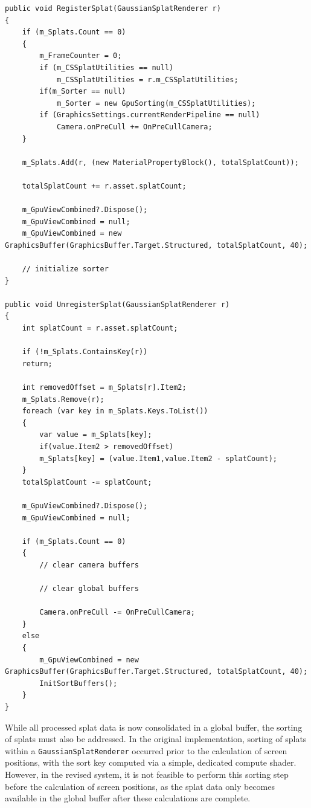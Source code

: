 \documentclass[12pt]{article}
\begin{document}
\begin{lstlisting}[tabsize=2,caption=New RegisterSplat and UnregisterSplat, label=code:register,breaklines=true,breakatwhitespace=true,basicstyle=\ttfamily\footnotesize]
public void RegisterSplat(GaussianSplatRenderer r)
{
	if (m_Splats.Count == 0)
	{
		m_FrameCounter = 0;
		if (m_CSSplatUtilities == null)
			m_CSSplatUtilities = r.m_CSSplatUtilities;
		if(m_Sorter == null)
			m_Sorter = new GpuSorting(m_CSSplatUtilities);
		if (GraphicsSettings.currentRenderPipeline == null)
			Camera.onPreCull += OnPreCullCamera;
	}
	
	m_Splats.Add(r, (new MaterialPropertyBlock(), totalSplatCount));
	
	totalSplatCount += r.asset.splatCount;
	
	m_GpuViewCombined?.Dispose();
	m_GpuViewCombined = null;
	m_GpuViewCombined = new GraphicsBuffer(GraphicsBuffer.Target.Structured, totalSplatCount, 40);
	
	// initialize sorter
}

public void UnregisterSplat(GaussianSplatRenderer r)
{
	int splatCount = r.asset.splatCount;

	if (!m_Splats.ContainsKey(r))
	return;
	
	int removedOffset = m_Splats[r].Item2;
	m_Splats.Remove(r);
	foreach (var key in m_Splats.Keys.ToList())
	{
		var value = m_Splats[key];
		if(value.Item2 > removedOffset)
		m_Splats[key] = (value.Item1,value.Item2 - splatCount);
	}
	totalSplatCount -= splatCount;
	
	m_GpuViewCombined?.Dispose();
	m_GpuViewCombined = null;
	
	if (m_Splats.Count == 0)
	{
		// clear camera buffers
		
		// clear global buffers
		
		Camera.onPreCull -= OnPreCullCamera;
	}
	else
	{
		m_GpuViewCombined = new GraphicsBuffer(GraphicsBuffer.Target.Structured, totalSplatCount, 40);
		InitSortBuffers();
	}
}
\end{lstlisting}
While all processed splat data is now consolidated in a global buffer, the sorting of splats must also be addressed. In the original implementation, sorting of splats within a \texttt{GaussianSplatRenderer} occurred prior to the calculation of screen positions, with the sort key computed via a simple, dedicated compute shader. However, in the revised system, it is not feasible to perform this sorting step before the calculation of screen positions, as the splat data only becomes available in the global buffer after these calculations are complete.\\
\end{document}
